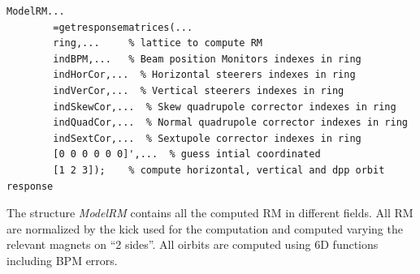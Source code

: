 \begin{lstlisting}
ModelRM...
        =getresponsematrices(...
        ring,...     % lattice to compute RM
        indBPM,...	 % Beam position Monitors indexes in ring
        indHorCor,...  % Horizontal steerers indexes in ring
        indVerCor,...  % Vertical steerers indexes in ring
        indSkewCor,...  % Skew quadrupole corrector indexes in ring
        indQuadCor,...  % Normal quadrupole corrector indexes in ring
        indSextCor,...  % Sextupole corrector indexes in ring
        [0 0 0 0 0 0]',...  % guess intial coordinated
        [1 2 3]);    % compute horizontal, vertical and dpp orbit response
\end{lstlisting}

The structure \emph{ModelRM} contains all the computed RM in different fields. All RM are normalized by the kick used for the computation and computed varying the relevant magnets on ``2 sides''. All oirbits are computed using 6D functions including BPM errors.

